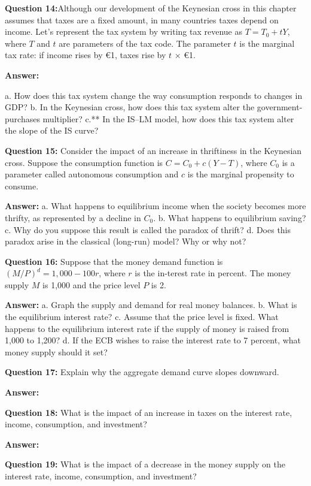 \documentclass[a4paper, 11pt]{article}
\begin{document}
\textbf{Question 14:}Although our development of the Keynesian cross in this chapter assumes that taxes are a fixed amount, in many countries taxes depend on income. Let’s represent the tax system by writing tax revenue as $T = T_{0} + tY$, where $T$ and $t$ are parameters of the tax code. The parameter $t$ is the marginal tax rate: if income rises by €1, taxes rise by $t$ × €1.

\textbf{Answer:}  

a. How does this tax system change the way consumption responds to changes in GDP?
b. In the Keynesian cross, how does this tax system alter the government-purchases multiplier?
c.** In the IS–LM model, how does this tax system alter the slope of the IS curve?

\textbf{Question 15:} Consider the impact of an increase in thriftiness in the Keynesian cross. Suppose the consumption function is $C = C_{0} + c(Y − T)$, where $C_{0}$ is a parameter called autonomous consumption and $c$ is the marginal propensity to consume.

\textbf{Answer:}  
a. What happens to equilibrium income when the society becomes more thrifty, as represented by a decline in $C_{0}$.
b. What happens to equilibrium saving?
c. Why do you suppose this result is called the paradox of thrift?
d. Does this paradox arise in the classical (long-run) model? Why or why not?

\textbf{Question 16:} Suppose that the money demand function is $(M/P)^{d}= 1,000 − 100r$, where $r$ is the in-terest rate in percent. The money supply $M$ is 1,000 and the price level $P$ is 2.

\textbf{Answer:} 
a. Graph the supply and demand for real money balances.
b. What is the equilibrium interest rate?
c. Assume that the price level is fixed. What happens to the equilibrium interest rate if the supply of money is raised from 1,000 to 1,200?
d. If the ECB wishes to raise the interest rate to 7 percent, what money supply should it set?

\textbf{Question 17:} Explain why the aggregate demand curve slopes downward.

\textbf{Answer:} 


\textbf{Question 18:} What is the impact of an increase in taxes on the interest rate, income, consumption, and investment?

\textbf{Answer:} 


\textbf{Question 19:} What is the impact of a decrease in the money supply on the interest rate, income, consumption, and investment?
\end{document}
